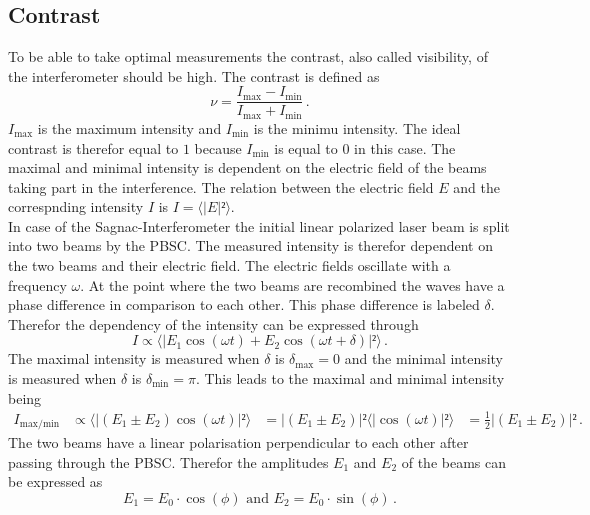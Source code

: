   \subsection{Contrast}
  To be able to take optimal measurements the contrast, also called visibility, of the interferometer should be high. The contrast is defined
   as 
  \begin{equation}
    \nu = \frac{I_{\text{max}}- I_{\text{min}}}{I_{\text{max}}+ I_{\text{min}}}\, .
    \label{eqn:contrast}
  \end{equation}
 $I_{\text{max}}$ is the maximum intensity and $I_{\text{min}}$ is the minimu intensity. The ideal contrast is therefor equal to $1$ because
 $I_{\text{min}}$ is equal to $0$ in this case. The maximal and minimal intensity is dependent on the electric field of the beams taking 
 part in the interference. The relation between the electric field $E$ and the correspnding intensity $I$ is $I = \langle |E|² \rangle$. \\
 In case of the Sagnac-Interferometer the initial linear polarized laser beam is split into two beams by the PBSC. The measured 
 intensity is therefor dependent on the two beams and their electric field. The electric fields oscillate with a frequency $\omega$. 
 At the point where the two beams are recombined the waves have a phase difference in comparison to each other. This phase difference
 is labeled $\delta$. Therefor the dependency of the intensity can be expressed through
 \begin{equation}
    I \propto \langle |E_1 \cos(\omega t) + E_2 \cos(\omega t + \delta)|²\rangle \, .
 \end{equation}
 The maximal intensity is measured when $\delta$ is $\delta_{\text{max}} = 0$ and the minimal intensity is
 measured when $\delta$ is $\delta_{\text{min}} = \pi$. 
 This leads to the maximal and minimal intensity being 
 \begin{align}
    I_{\text{max/min}} &\propto \langle |(E_1 \pm E_2) \cos(\omega t)|²\rangle 
    &= |(E_1 \pm E_2)|² \langle |\cos(\omega t)|²\rangle 
    &= \frac{1}{2} |(E_1 \pm E_2)|² \, .
 \end{align}
 The two beams have a linear polarisation perpendicular to each other after passing through the PBSC. 
 Therefor the amplitudes $E_1$ and $E_2$ of the beams can be expressed as 
 \begin{equation}
    E_1 = E_0 \cdot \cos(\phi) \,\, \text{and} \,\, E_2 = E_0 \cdot \sin(\phi) \, .
    \label{eqn:E_Felder}
 \end{equation}

